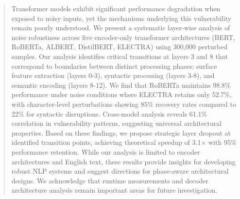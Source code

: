 \begin{abstract}
Transformer models exhibit significant performance degradation when exposed to noisy inputs, yet the mechanisms underlying this vulnerability remain poorly understood. We present a systematic layer-wise analysis of noise robustness across five encoder-only transformer architectures (BERT, RoBERTa, ALBERT, DistilBERT, ELECTRA) using 300,000 perturbed samples. Our analysis identifies critical transitions at layers 3 and 8 that correspond to boundaries between distinct processing phases: surface feature extraction (layers 0-3), syntactic processing (layers 3-8), and semantic encoding (layers 8-12). We find that RoBERTa maintains 98.8\% performance under noise conditions where ELECTRA retains only 52.7\%, with character-level perturbations showing 85\% recovery rates compared to 22\% for syntactic disruptions. Cross-model analysis reveals 61.1\% correlation in vulnerability patterns, suggesting universal architectural properties. Based on these findings, we propose strategic layer dropout at identified transition points, achieving theoretical speedup of 3.1× with 95\% performance retention. While our analysis is limited to encoder architectures and English text, these results provide insights for developing robust NLP systems and suggest directions for phase-aware architectural designs. We acknowledge that runtime measurements and decoder architecture analysis remain important areas for future investigation.
\end{abstract}
